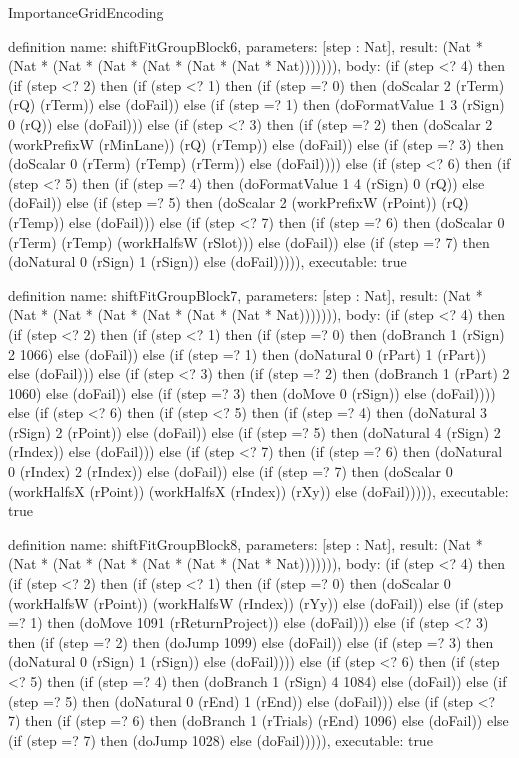 \begin{lexlean}{ImportanceGridEncoding}
\begin{semanticmodule}
definition{
  name: shiftFitGroupBlock6,
  parameters: [step : Nat],
  result: (Nat * (Nat * (Nat * (Nat * (Nat * (Nat * (Nat * Nat))))))),
  body: (if (step <? 4) then
      (if (step <? 2) then
      (if (step <? 1) then
      (if (step =? 0) then (doScalar 2 (rTerm) (rQ) (rTerm)) else (doFail)) else
      (if (step =? 1) then (doFormatValue 1 3 (rSign) 0 (rQ)) else (doFail))) else
      (if (step <? 3) then
      (if (step =? 2) then (doScalar 2 (workPrefixW (rMinLane)) (rQ) (rTemp)) else (doFail)) else
      (if (step =? 3) then (doScalar 0 (rTerm) (rTemp) (rTerm)) else (doFail)))) else
      (if (step <? 6) then
      (if (step <? 5) then
      (if (step =? 4) then (doFormatValue 1 4 (rSign) 0 (rQ)) else (doFail)) else
      (if (step =? 5) then (doScalar 2 (workPrefixW (rPoint)) (rQ) (rTemp)) else (doFail))) else
      (if (step <? 7) then
      (if (step =? 6) then (doScalar 0 (rTerm) (rTemp) (workHalfsW (rSlot))) else (doFail)) else
      (if (step =? 7) then (doNatural 0 (rSign) 1 (rSign)) else (doFail))))),
  executable: true
}

definition{
  name: shiftFitGroupBlock7,
  parameters: [step : Nat],
  result: (Nat * (Nat * (Nat * (Nat * (Nat * (Nat * (Nat * Nat))))))),
  body: (if (step <? 4) then
      (if (step <? 2) then
      (if (step <? 1) then
      (if (step =? 0) then (doBranch 1 (rSign) 2 1066) else (doFail)) else
      (if (step =? 1) then (doNatural 0 (rPart) 1 (rPart)) else (doFail))) else
      (if (step <? 3) then
      (if (step =? 2) then (doBranch 1 (rPart) 2 1060) else (doFail)) else
      (if (step =? 3) then (doMove 0 (rSign)) else (doFail)))) else
      (if (step <? 6) then
      (if (step <? 5) then
      (if (step =? 4) then (doNatural 3 (rSign) 2 (rPoint)) else (doFail)) else
      (if (step =? 5) then (doNatural 4 (rSign) 2 (rIndex)) else (doFail))) else
      (if (step <? 7) then
      (if (step =? 6) then (doNatural 0 (rIndex) 2 (rIndex)) else (doFail)) else
      (if (step =? 7) then (doScalar 0 (workHalfsX (rPoint)) (workHalfsX (rIndex)) (rXy)) else (doFail))))),
  executable: true
}

definition{
  name: shiftFitGroupBlock8,
  parameters: [step : Nat],
  result: (Nat * (Nat * (Nat * (Nat * (Nat * (Nat * (Nat * Nat))))))),
  body: (if (step <? 4) then
      (if (step <? 2) then
      (if (step <? 1) then
      (if (step =? 0) then (doScalar 0 (workHalfsW (rPoint)) (workHalfsW (rIndex)) (rYy)) else (doFail)) else
      (if (step =? 1) then (doMove 1091 (rReturnProject)) else (doFail))) else
      (if (step <? 3) then
      (if (step =? 2) then (doJump 1099) else (doFail)) else
      (if (step =? 3) then (doNatural 0 (rSign) 1 (rSign)) else (doFail)))) else
      (if (step <? 6) then
      (if (step <? 5) then
      (if (step =? 4) then (doBranch 1 (rSign) 4 1084) else (doFail)) else
      (if (step =? 5) then (doNatural 0 (rEnd) 1 (rEnd)) else (doFail))) else
      (if (step <? 7) then
      (if (step =? 6) then (doBranch 1 (rTrials) (rEnd) 1096) else (doFail)) else
      (if (step =? 7) then (doJump 1028) else (doFail))))),
  executable: true
}


\end{semanticmodule}
\end{lexlean}
